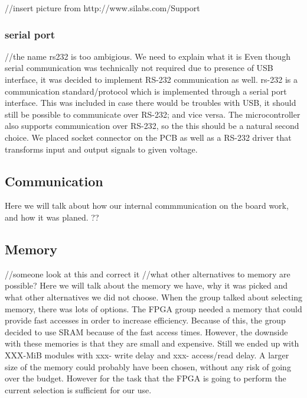 //insert picture from http://www.silabs.com/Support%


\subsubsection{serial port} //the name rs232 is too ambigious. We need to explain what it is
Even though serial communication was technically not required due to presence of USB interface, it was decided to implement RS-232 communication as well.
rs-232 is a communication standard/protocol which is implemented through a serial port interface.
This was included in case there would be troubles with USB, it should still be possible to communicate over RS-232; and vice versa.
The microcontroller also supports communication over RS-232, so the this should be a natural second choice.
We placed socket connector on the PCB as well as a RS-232 driver that transforms input and output signals to given voltage.

\subsection{Communication} \label{pcb:design-choices:ss:internal_communication}

Here we will talk about how our internal commmunication on the board work, and how it was planed.
??


\subsection{Memory} \label{pcb:design-choices:ss:memory}
//someone look at this and correct it
//what other alternatives to memory are possible?
Here we will talk about the memory we have, why it was picked and what other alternatives we did not choose.
When the group talked about selecting memory, there was lots of options. The FPGA group needed a memory that could provide 
fast accesses in order to increase efficiency. Because of this, the group decided to use SRAM because of the fast access times.
However, the downside with these memories is that they are small and expensive. Still we ended up with XXX-MiB modules with xxx- write delay and xxx- access/read delay.
A larger size of the memory could probably have been chosen, without any risk of going over the budget. However for the task that the FPGA is going to perform
the current selection is sufficient for our use.
